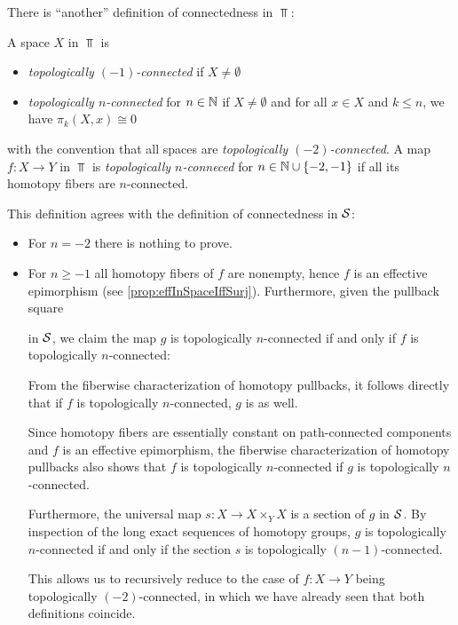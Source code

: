 \begin{remark}
    There is ``another'' definition of connectedness in $\Top$:

    A space $X$ in $\Top$ is 
    \begin{itemize}
        \item \emph{topologically $(-1)$-connected} if $X\neq\emptyset$
        \item \emph{topologically $n$-connected} for $n\in\mathbb{N}$ if $X\neq\emptyset$ and for all $x\in X$ and $k\leq n$, we have $\pi_k(X,x)\cong 0$
    \end{itemize}
    with the convention that all spaces are \emph{topologically $(-2)$-connected}.
    A map $f\colon X\to Y$ in $\Top$ is \emph{topologically $n$-conneced} for $n\in\mathbb{N}\cup\left\lbrace-2,-1\right\rbrace$ if all its homotopy fibers are $n$-connected. 

    This definition agrees with the definition of connectedness in $\mathcal{S}$:
    \begin{itemize}
        \item For $n=-2$ there is nothing to prove.
        \item For $n\geq -1$ all homotopy fibers of $f$ are nonempty, hence $f$ is an effective epimorphism (see \cref{prop:effInSpaceIffSurj}).
            Furthermore, given the pullback square
            \begin{center}
            \end{center}
            in $\mathcal{S}$, we claim the map $g$ is topologically $n$-connected if and only if $f$ is topologically $n$-connected:
            
            From the fiberwise characterization of homotopy pullbacks, it follows directly that if $f$ is topologically $n$-connected, $g$ is as well.%

            Since homotopy fibers are essentially constant on path-connected components and $f$ is an effective epimorphism, the fiberwise characterization of homotopy pullbacks also shows that $f$ is topologically $n$-connected if $g$ is topologically $n$-connected.

            Furthermore, the universal map $s\colon X\to X\times_{Y} X$ is a section of $g$ in $\mathcal{S}$.
            By inspection of the long exact sequences of homotopy groups, $g$ is topologically $n$-connected if and only if the section $s$ is topologically $(n-1)$-connected.

            This allows us to recursively reduce to the case of $f\colon X\to Y$ being topologically $(-2)$-connected, in which we have already seen that both definitions coincide.
    \end{itemize}
\end{remark}
